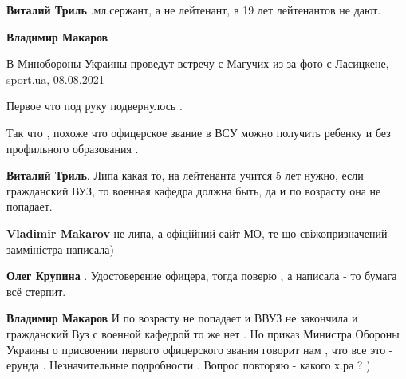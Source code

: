 \begin{itemize}
\begin{itemize}

 
\textbf{Виталий Триль} .мл.сержант, а не лейтенант, в 19 лет лейтенантов не дают.


 
\textbf{Владимир Макаров} 

\href{https://sport.ua/news/549118-v-minoborony-ukrainy-provedut-vstrechu-s-maguchih-iz-za-foto-s-lasitskene}{%
В Минобороны Украины проведут встречу с Магучих из-за фото с Ласицкене, sport.ua, 08.08.2021%
}

Первое что под руку подвернулось .
 
Так что , похоже что офицерское звание в ВСУ можно получить ребенку и без профильного образования .


\textbf{Виталий Триль}. Липа какая то, на лейтенанта учится 5 лет нужно, если
гражданский ВУЗ, то военная кафедра должна быть, да и по возрасту она не
попадает.

 
\textbf{Vladimir Makarov} не липа, а офіційний сайт МО, те що свіжопризначений замміністра написала)

 
\textbf{Олег Крупина} . Удостоверение офицера, тогда поверю , а написала - то бумага всё стерпит.

 
\textbf{Владимир Макаров} И по возрасту не попадает и ВВУЗ не закончила и гражданский Вуз с военной кафедрой то же нет . Но приказ Министра Обороны Украины о присвоении первого офицерского звания говорит нам , что все это - ерунда . Незначительные подробности . Вопрос повторяю - какого х.ра ? )


\end{itemize}
\end{itemize}
